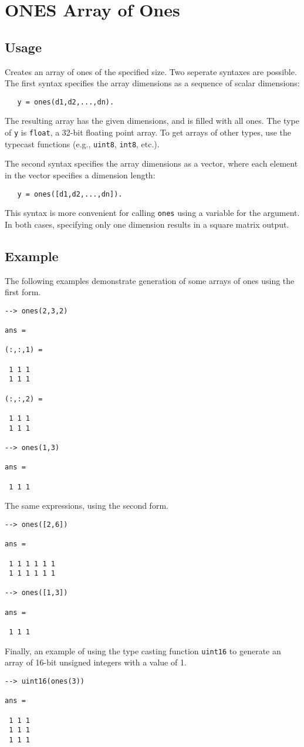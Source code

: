 \section{ONES Array of Ones}

\subsection{Usage}

Creates an array of ones of the specified size.  Two seperate 
syntaxes are possible.  The first syntax specifies the array 
dimensions as a sequence of scalar dimensions:
\begin{verbatim}
   y = ones(d1,d2,...,dn).
\end{verbatim}
The resulting array has the given dimensions, and is filled with
all ones.  The type of \verb|y| is \verb|float|, a 32-bit floating
point array.  To get arrays of other types, use the typecast 
functions (e.g., \verb|uint8|, \verb|int8|, etc.).
    
The second syntax specifies the array dimensions as a vector,
where each element in the vector specifies a dimension length:
\begin{verbatim}
   y = ones([d1,d2,...,dn]).
\end{verbatim}
This syntax is more convenient for calling \verb|ones| using a 
variable for the argument.  In both cases, specifying only one
dimension results in a square matrix output.
\subsection{Example}

The following examples demonstrate generation of some arrays of ones
using the first form.
\begin{verbatim}
--> ones(2,3,2)

ans = 

(:,:,1) = 

 1 1 1 
 1 1 1 

(:,:,2) = 

 1 1 1 
 1 1 1 

--> ones(1,3)

ans = 

 1 1 1 
\end{verbatim}
The same expressions, using the second form.
\begin{verbatim}
--> ones([2,6])

ans = 

 1 1 1 1 1 1 
 1 1 1 1 1 1 

--> ones([1,3])

ans = 

 1 1 1 
\end{verbatim}
Finally, an example of using the type casting function \verb|uint16| to generate an array of 16-bit unsigned integers with a value of 1.
\begin{verbatim}
--> uint16(ones(3))

ans = 

 1 1 1 
 1 1 1 
 1 1 1 
\end{verbatim}
